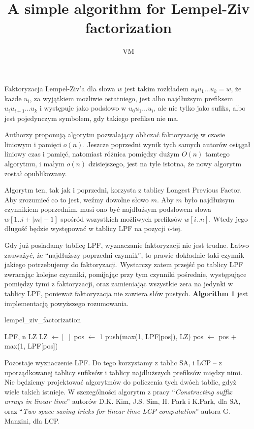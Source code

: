 \documentclass[a4paper,12pt]{article}
\title{A simple algorithm for Lempel-Ziv factorization}
\author{VM}
\theoremstyle{definition}
\begin{document}
\maketitle

Faktoryzacja Lempel-Ziv'a dla słowa $w$ jest takim rozkładem $u_0 u_1 ... u_k = w$,
 że każde $u_i$, za wyjątkiem możliwie ostatniego,
 jest albo najdłużsym prefiksem $u_i u_{i + 1} ... u_k$ i występuje jako podsłowo w $u_0 u_1 ... u_i$,
 ale nie tylko jako sufiks,
 albo jest pojedynczym symbolem, gdy takiego prefiksu nie ma.

Authorzy proponują algorytm pozwalający obliczać faktoryzację w czasie liniowym i pamięci $o(n)$.
Jeszcze poprzedni wynik tych samych autorów osiągał liniowy czas i pamięć,
 natomiast różnica pomiędzy dużym $O(n)$ tamtego algorytmu, i małym $o(n)$ dzisiejszego, jest na tyle istotna,
 że nowy algorytm został opublikowany.

Algorytm ten, tak jak i poprzedni, korzysta z tablicy Longest Previous Factor.
Aby zrozumieć co to jest, weźmy dowolne słowo $m$.
Aby $m$ było najdłużsym czynnikiem poprzednim,
 musi ono być najdłużsym podsłowem słowa $w[1..i + |m| - 1]$ spośród wszystkich możliwych prefiksów $w[i..n]$.
Wtedy jego długość będzie występować w tablicy LPF na pozycji $i$-tej.

Gdy już posiadamy tablicę LPF, wyznaczanie faktoryzacji nie jest trudne.
Łatwo zauważyć, że ``najdłuższy poprzedni czynnik'', to prawie dokładnie taki czynnik jakiego potrzebujemy do faktoryzacji.
Wystarczy zatem przejść po tablicy LPF zwracając kolejne czynniki,
 pomijając przy tym czynniki pośrednie, występujące pomiędzy tymi z faktoryzacji,
 oraz zamieniając wszystkie zera na jedynki w tablicy LPF, ponieważ faktoryzacja nie zawiera słów pustych.
\textbf{Algorithm 1} jest implementacją powyższego rozumowania.

\begin{algorithm}
\caption{lempel\_ziv\_factorization}
\begin{algorithmic}
\REQUIRE LPF, n
\ENSURE LZ
\STATE LZ $\gets [\;]$
\STATE pos $\gets$ 1
\STATE push(max(1, LPF[pos]), LZ)
\STATE pos $\gets$ pos + max(1, LPF[pos])
\ENDWHILE
\end{algorithmic}
\end{algorithm}

Pozostaje wyznaczenie LPF. Do tego korzystamy z tablic SA, i LCP --
 z uporządkowanej tablicy sufiksów i tablicy najdłuższych prefiksów między nimi.
Nie będziemy projektować algorytmów do policzenia tych dwóch tablic,
 gdyż wiele takich istnieje.
W szczególności algorytm z pracy ``\textit{Constructing suffix arrays in linear time}'' autorów D.K. Kim, J.S. Sim, H. Park i K.Park,
 dla SA, oraz ``\textit{Two space-saving tricks for linear-time LCP computation}'' autora G. Manzini, dla LCP.
\end{document}
